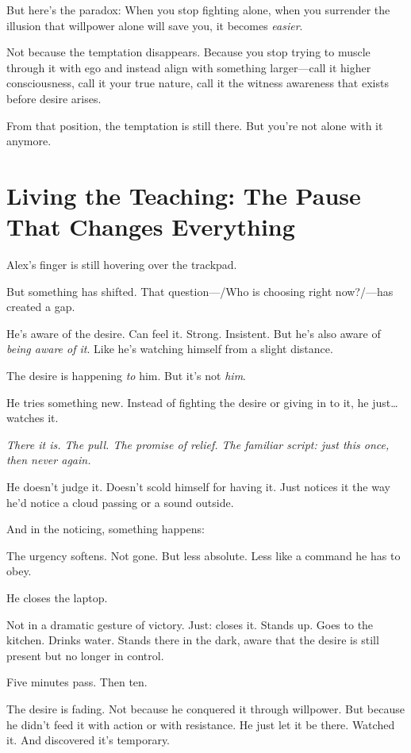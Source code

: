 \documentclass[11pt,twoside]{book}
\begin{document}
But here's the paradox: When you stop fighting alone, when you surrender the illusion that willpower alone will save you, it becomes \textit{easier}.

Not because the temptation disappears. Because you stop trying to muscle through it with ego and instead align with something larger—call it higher consciousness, call it your true nature, call it the witness awareness that exists before desire arises.

From that position, the temptation is still there. But you're not alone with it anymore.

\section*{Living the Teaching: The Pause That Changes Everything}

Alex's finger is still hovering over the trackpad.

But something has shifted. That question—/Who is choosing right now?/—has created a gap.

He's aware of the desire. Can feel it. Strong. Insistent. But he's also aware of \emph{being aware of it}. Like he's watching himself from a slight distance.

The desire is happening \emph{to} him. But it's not \emph{him}.

He tries something new. Instead of fighting the desire or giving in to it, he just\ldots{} watches it.

\emph{There it is. The pull. The promise of relief. The familiar script: just this once, then never again.}

He doesn't judge it. Doesn't scold himself for having it. Just notices it the way he'd notice a cloud passing or a sound outside.

And in the noticing, something happens:

The urgency softens. Not gone. But less absolute. Less like a command he has to obey.

He closes the laptop.

Not in a dramatic gesture of victory. Just: closes it. Stands up. Goes to the kitchen. Drinks water. Stands there in the dark, aware that the desire is still present but no longer in control.

Five minutes pass. Then ten.

The desire is fading. Not because he conquered it through willpower. But because he didn't feed it with action or with resistance. He just let it be there. Watched it. And discovered it's temporary.
\end{document}
